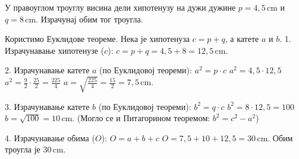 \documentclass[11pt,a5paper,addpoints]{exam}
\def\measure#1#2{#1 \, \mathrm{#2}}
\begin{document}
\begin{questions}
\question[4]
 У правоуглом троуглу висина дели хипотенузу на дужи дужине
 $p = \measure{4{,}5}{cm}$ и $q = \measure{8}{cm}$.
 Израчунај обим тог троугла.
 \begin{solution}[\stretch 9] %
  Користимо Еуклидове теореме. Нека је хипотенуза $c = p+q$, а катете $a$ и $b$.
  1. Израчунавање хипотенузе ($c$):
  $c = p + q = 4{,}5 + 8 = \measure{12{,}5}{cm}$.

  2. Израчунавање катете $a$ (по Еуклидовој теореми):
  $a^2 = p \cdot c$
  $a^2 = 4{,}5 \cdot 12{,}5$
  $a^2 = \frac{9}{2} \cdot \frac{25}{2} = \frac{225}{4}$
  $a = \sqrt{\frac{225}{4}} = \frac{15}{2} = \measure{7{,}5}{cm}$.

  3. Израчунавање катете $b$ (по Еуклидовој теореми):
  $b^2 = q \cdot c$
  $b^2 = 8 \cdot 12{,}5 = 100$
  $b = \sqrt{100} = \measure{10}{cm}$.
  (Могло се и Питагорином теоремом: $b^2 = c^2 - a^2$)

  4. Израчунавање обима ($O$):
  $O = a + b + c$
  $O = 7{,}5 + 10 + 12{,}5 = \measure{30}{cm}$.
  Обим троугла је $\measure{30}{cm}$.
 \end{solution}
 \answerline

\end{questions}

\end{document}
